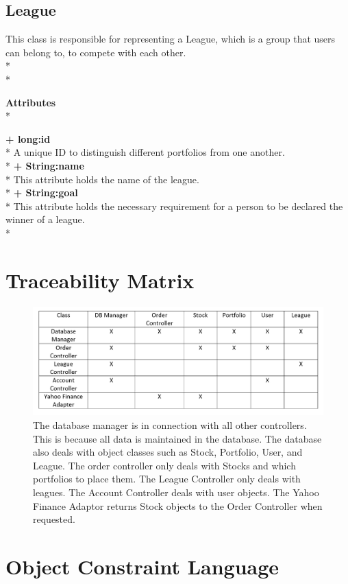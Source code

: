 \subsection{League}
This class is responsible for representing a League, which is a group that
users can belong to, to compete with each other.\\* \\*

{\bfseries Attributes} \\*

{\bfseries + long:id} \\*
A unique ID to distinguish different portfolios from one another.\\*
{\bfseries + String:name} \\*
This attribute holds the name of the league.\\*
{\bfseries + String:goal} \\*
This attribute holds the necessary requirement for a person to be declared the
winner of a league. \\*

\section{Traceability Matrix}


\begin{figure}[H]
\centering
\includegraphics[width=5.5in]{./img/trace.jpg}
\caption{The database manager is in connection with all other controllers. This
is because all data is maintained in the database. The database also deals with
object classes such as Stock, Portfolio, User, and League. The order controller
only deals with Stocks and which portfolios to place them. The League Controller
only deals with leagues. The Account Controller deals with user objects. The
Yahoo Finance Adaptor returns Stock objects to the Order Controller when
requested.}
\end{figure}

\section{Object Constraint Language}

